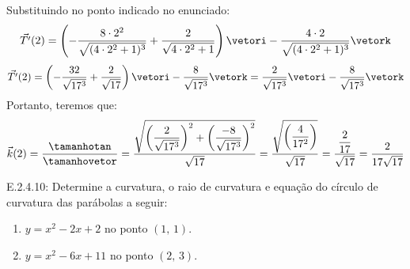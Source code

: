 \begin{enumerate}
\begin{equation*}
	\end{equation*}
	Substituindo no ponto indicado no enunciado:
	\begin{equation*}
		\vec{T'}(2)=\left(-\dfrac{8\cdot2^2}{\sqrt{(4\cdot2^2+1)^3}}+\dfrac{2}{\sqrt{4\cdot2^2+1}}\right)\vetori-\dfrac{4\cdot2}{\sqrt{(4\cdot2^2+1)^3}}\vetork
	\end{equation*}
	\begin{equation*}
		\vec{T'}(2)=\left(-\dfrac{32}{\sqrt{17^3}}+\dfrac{2}{\sqrt{17}}\right)\vetori-\dfrac{8}{\sqrt{17^3}}\vetork=\dfrac{2}{\sqrt{17^3}}\vetori-\dfrac{8}{\sqrt{17^3}}\vetork
	\end{equation*}
	Portanto, teremos que:
	\begin{equation*}
		\vec{k}(2)=\dfrac{\tamanhotan}{\tamanhovetor}=\dfrac{\sqrt{\left(\dfrac{2}{\sqrt{17^3}}\right)^2+\left(\dfrac{-8}{\sqrt{17^3}}\right)^2}}{\sqrt{17}}=\dfrac{\sqrt{\left(\dfrac{4}{17^2}\right)}}{\sqrt{17}}=\dfrac{\dfrac{2}{17}}{\sqrt{17}}=\dfrac{2}{17\sqrt{17}}
	\end{equation*}
\end{enumerate}

E.2.4.10: Determine a curvatura, o raio de curvatura e equação do círculo de curvatura das parábolas a seguir: 
		\begin{enumerate}
			\item $y=x^2-2x+2$ no ponto $(1,\,1)$.
			\item $y=x^2-6x+11$ no ponto $(2,\,3)$.
		\end{enumerate}
% 
% 
% 



\construirExer




% 
%
